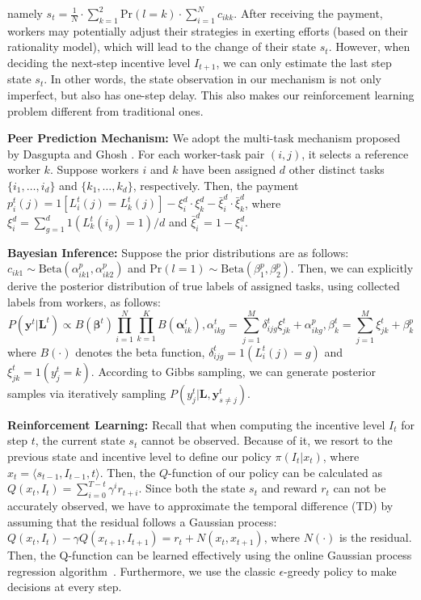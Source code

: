 \documentclass{article}
\begin{document}
namely $s_t =\frac{1}{N}\cdot \sum_{k=1}^2\textrm{Pr}(l=k)\cdot  \sum_{i=1}^{N}c_{ikk}$.
After receiving the payment, workers may potentially adjust their strategies in exerting efforts (based on their rationality model), which will lead to the change of their state $s_t$.
However, when deciding the next-step incentive level $I_{t+1}$, we can only estimate the last step state $s_t$.
In other words, the state observation in our mechanism is not only imperfect, but also has one-step delay. This also makes our reinforcement learning problem different from traditional ones.

\noindent \textbf{Peer Prediction Mechanism:} We adopt the multi-task mechanism proposed by Dasgupta and Ghosh \cite{dasgupta2013crowdsourced}.  For each worker-task pair $(i, j)$, it selects a reference worker $k$. Suppose workers $i$ and $k$ have been assigned $d$ other distinct tasks $\{i_1,\ldots,i_d\}$ and $\{k_1,\ldots, k_d\}$, respectively. Then, the payment $p^t_{i}(j)= 1[L^{t}_i(j)=L^{t}_k(j)]- \xi_{i}^d\cdot \xi_{k}^d -\bar{\xi}_{i}^d\cdot \bar{\xi}_{k}^d$, where $\xi_{i}^{d}=\sum_{g=1}^{d}1(L^{t}_k(i_g)=1)/d$ and $\bar{\xi}_{i}^{d}=1-\xi_{i}^{d}$.

\noindent \textbf{Bayesian Inference:} Suppose the prior distributions are as follows: $c_{ik1}\sim \textrm{Beta}(\alpha^{p}_{ik1},\alpha^{p}_{ik2})$ and $\textrm{Pr}(l=1)\sim \textrm{Beta}(\beta^{p}_{1},\beta^{p}_{2})$. Then, we can explicitly derive the posterior distribution of true labels of assigned tasks, using collected labels from workers, as follows:
\begin{equation}
\label{PostDist}
P(\bm{y}^{t}|\bm{L}^{t})\propto B(\bm{\beta}^{t}){\prod}_{i=1}^{N}{\prod}_{k=1}^{K} B(\bm{\alpha}^{t}_{ik}), \alpha^{t}_{ikg}={\sum}_{j=1}^{M}\delta^{t}_{ijg}\xi^{t}_{jk}+\alpha^{p}_{ikg}, \beta^{t}_k={\sum}_{j=1}^{M}\xi^{t}_{jk}+\beta^{p}_{k}
\end{equation}
where $B(\cdot)$ denotes the beta function, $\delta^{t}_{ijg}=1(L^t_i(j)=g)$ and $\xi^{t}_{jk}= 1(y^{t}_j=k)$. According to Gibbs sampling, we can generate posterior samples via iteratively sampling $P(y^{t}_j|\bm{L}, \bm{y}^t_{s\neq j})$.

\noindent \textbf{Reinforcement Learning:} Recall that when computing the incentive level $I_{t}$ for step $t$, the current state $s_{t}$ cannot be observed. Because of it, we resort to the previous state and incentive level to define our  policy $\pi(I_{t}|x_t)$, where $x_t=\langle s_{t-1}, I_{t-1}, t \rangle$.
Then, the $Q$-function of our policy can be calculated as $Q(x_t, I_t)= \sum_{i=0}^{T-t} \gamma^{i} r_{t+i}$.  %
Since both the state $s_t$ and reward $r_t$ can not be accurately observed, we have to approximate the temporal difference (TD) by assuming that the residual follows a Gaussian process: $Q(x_t, I_t) - \gamma Q(x_{t+1}, I_{t+1}) = r_t + N(x_t,x_{t+1})$, where $N(\cdot)$ is the residual. Then, the Q-function can be learned effectively using the online Gaussian process regression algorithm~\cite{engel2005reinforcement}. Furthermore, we use the classic $\epsilon$-greedy policy to make decisions at every step.
\end{document}
